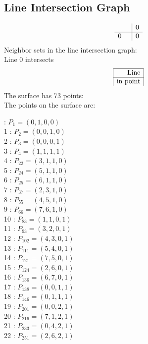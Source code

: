 \documentclass{article}
\begin{document}
{\subsection*{Line Intersection Graph}
{\arraycolsep=1pt
$$
\begin{array}{rr|*{1}r}
 &  & 0\\
\hline
0 &  & 0\\
\end{array}
$$
}%
Neighbor sets in the line intersection graph:\\
Line 0 intersects 
$$
\begin{array}{|r*{0}{|c}|}
\hline
\mbox{Line} \\
\hline
\mbox{in point} \\
\hline
\end{array}
$$
The surface has 73 points:\\
The points on the surface are:\\
\begin{multicols}{3}
 : $P_{1}=( 0, 1, 0, 0 )$\\
1 : $P_{2}=( 0, 0, 1, 0 )$\\
2 : $P_{3}=( 0, 0, 0, 1 )$\\
3 : $P_{4}=( 1, 1, 1, 1 )$\\
4 : $P_{22}=( 3, 1, 1, 0 )$\\
5 : $P_{24}=( 5, 1, 1, 0 )$\\
6 : $P_{25}=( 6, 1, 1, 0 )$\\
7 : $P_{37}=( 2, 3, 1, 0 )$\\
8 : $P_{55}=( 4, 5, 1, 0 )$\\
9 : $P_{66}=( 7, 6, 1, 0 )$\\
10 : $P_{83}=( 1, 1, 0, 1 )$\\
11 : $P_{93}=( 3, 2, 0, 1 )$\\
12 : $P_{102}=( 4, 3, 0, 1 )$\\
13 : $P_{111}=( 5, 4, 0, 1 )$\\
14 : $P_{121}=( 7, 5, 0, 1 )$\\
15 : $P_{124}=( 2, 6, 0, 1 )$\\
16 : $P_{136}=( 6, 7, 0, 1 )$\\
17 : $P_{138}=( 0, 0, 1, 1 )$\\
18 : $P_{146}=( 0, 1, 1, 1 )$\\
19 : $P_{201}=( 0, 0, 2, 1 )$\\
20 : $P_{216}=( 7, 1, 2, 1 )$\\
21 : $P_{233}=( 0, 4, 2, 1 )$\\
22 : $P_{251}=( 2, 6, 2, 1 )$\\

\end{multicols}}
\end{document}
